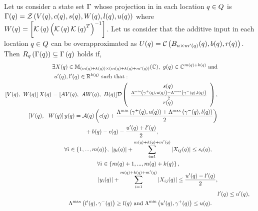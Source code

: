 \begin{lemma}
  Let  
  us consider a state set $\Gamma$ whose projection in in each
  location $q\in Q$ is $\Gamma(q) =
  \mathcal{Z}\left(V(q),c(q),s(q),W(q),l(q),u(q)\right)$ where
  $W(q)={\left[\mathcal{K}\left(q\right)\left(\mathcal{K}\left(q\right)\mathcal{K}\left(q\right)^T\right)^{-1}\right]}$.  Let us consider that the additive input in each location
  $q\in Q$ can be overapproximated as $U(q) = \mathcal{C}\left(B_{n\times
      m^\prime(q)}(q),b(q),r(q)\right)$.  Then
   $R_{q}\left(\Gamma(q)\right)
  \subseteq \Gamma\left(q\right)$ holds if,
\begin{align}
\begin{split}
& \exists X(\loc)\in\mat{\lt(m(\loc)+k(\loc)\rt)}{\lt(m(\loc)+k(\loc)+m^\pr(\loc)\rt)}{\mb{C}},~
y(\loc)\in\mb{C}^{m(\loc)+k(\loc)}~\text{and}\\&~u^\pr(\loc),l^\pr(\loc)\in\realset^{k(\loc)}~\text{such
  that}:\\
\end{split}\\
\begin{split}
& \left[V(\loc),~W(\loc)\rt]X(\loc) =
  [AV(\loc),~AW(\loc),~B(\loc)]\dg\lt(\cjoin{\hspace{3em}~~~~~~~~s(\loc)}{\frac{\minaffine{\stay^+(\loc)}{u(\loc)}
      -\maxaffine{\stay^-(\loc)}{l(\loc)}}{2}}{\hspace{3em}~~~~~~~~r(\loc)}\rt),\\
\end{split}\\
\begin{split}
  & \left[V(\loc),~~W(\loc)\rt]y(\loc) = 
    \map(\loc)\lt(c(\loc)+\frac{\minaffine{\stay^+(\loc)}{u(\loc)}
     +\maxaffine{\stay^-(\loc)}{l(\loc)}}{2}\rt)\\ & \hspace{10em} +
  b(\loc)-c(\loc)-\frac{u^\pr(\loc)+l^\pr(\loc)}{2},
\end{split}\\
\begin{split}
& \forall
i\in\tup{m(\loc)},~\lt|y_i(\loc)\rt|+\sum_{i=1}^{m(\loc)+k(\loc)+m^\pr(\loc)}\lt|X_{ij}(\loc)\rt|\leq
s_i(\loc),
\end{split}\\
\begin{split}
& \forall
i\in\lt\{m(\loc)+1,...,m(\loc)+k(\loc)\rt\},\\
&\lt|y_i(\loc)\rt|+\sum_{i=1}^{m(\loc)+k(\loc)+m^\pr(\loc)}\lt|X_{ij}(\loc)\rt|\leq
\frac{u^\pr(\loc)-l^\pr(\loc)}{2},
\end{split}\\
& l^\pr(\loc)\leq u^\pr(\loc),\\
\begin{split}
& \maxaffine{l^\pr(\loc)}{\stay^-(\loc)}\geq
l(\loc)~\text{and}~\minaffine{u^\pr(\loc)}{\stay^+(\loc)}\leq u(\loc).
\end{split}
\end{align}
\end{lemma}

